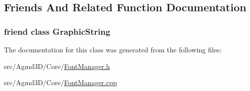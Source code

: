 \subsection{Friends And Related Function Documentation}
\hypertarget{class_agmd_1_1_font_manager_a971cc7a00cba96fee3ed8f4278f2a6be}{
\subsubsection[{Graphic\+String}]{\setlength{\rightskip}{0pt plus 5cm}friend class {\bf Graphic\+String}\hspace{0.3cm}{\ttfamily [friend]}}}\label{class_agmd_1_1_font_manager_a971cc7a00cba96fee3ed8f4278f2a6be}


The documentation for this class was generated from the following files\+:\begin{DoxyCompactItemize}
\item 
src/\+Agmd3\+D/\+Core/\hyperlink{_font_manager_8h}{Font\+Manager.\+h}\item 
src/\+Agmd3\+D/\+Core/\hyperlink{_font_manager_8cpp}{Font\+Manager.\+cpp}\end{DoxyCompactItemize}
